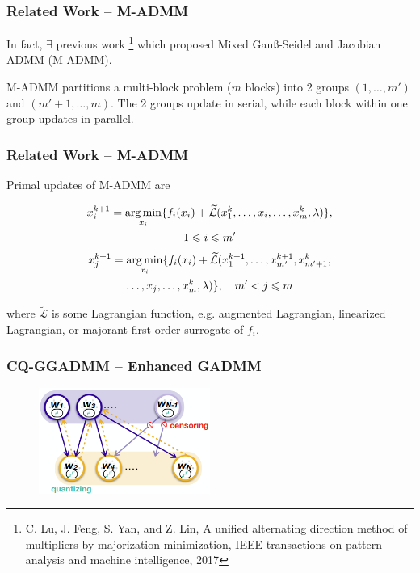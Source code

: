 
\begin{frame}
\frametitle{Related Work -- M-ADMM}

In fact, $\exists$ previous work \cite{lu2017unified}\footnote{C. Lu, J. Feng, S. Yan, and Z. Lin, A unified alternating direction method of multipliers by majorization minimization, IEEE transactions on pattern analysis and machine intelligence, 2017} which proposed Mixed Gau\ss-Seidel and Jacobian ADMM (M-ADMM).

\vspace{0.6em}

M-ADMM partitions a {\color{red} multi-block problem} ($m$ blocks) into 2 groups $(1,\ldots,m')$ and $(m'+1,\ldots,m)$. The 2 groups update {\color{red} in serial}, while each block within one group updates {\color{red} in parallel}.

\end{frame}


\begin{frame}
\frametitle{Related Work -- M-ADMM}

Primal updates of M-ADMM are
\begin{fleqn}
\begin{multline*}
    x_i^{k+1} = \operatorname*{arg\,min}_{x_i} \{ f_i(x_i) + \widetilde{\mathcal{L}}(x_1^{k},\ldots,x_i,\ldots,x_m^{k}, \lambda) \},\\
    1\leqslant i \leqslant m'
\end{multline*}
\begin{multline*}
    x_j^{k+1} = \operatorname*{arg\,min}_{x_i} \{ f_i(x_i) + \widetilde{\mathcal{L}}(x_1^{k+1},\ldots,x_{m'}^{k+1},x_{m'+1}^{k},\\
    \ldots,x_j,\ldots,x_m^{k}, \lambda) \}, \quad m' < j \leqslant m
\end{multline*}
\end{fleqn}
where $\widetilde{\mathcal{L}}$ is some Lagrangian function, e.g. augmented Lagrangian, linearized Lagrangian, or {\color{red} majorant first-order surrogate} of $f_i$.

\end{frame}


\begin{frame}
\frametitle{CQ-GGADMM -- Enhanced GADMM}

\begin{figure}[H]
    \centering
    \includegraphics[width=0.5\textwidth,keepaspectratio]{images/CQ-GGADMM.png}
\end{figure}

\end{frame}

